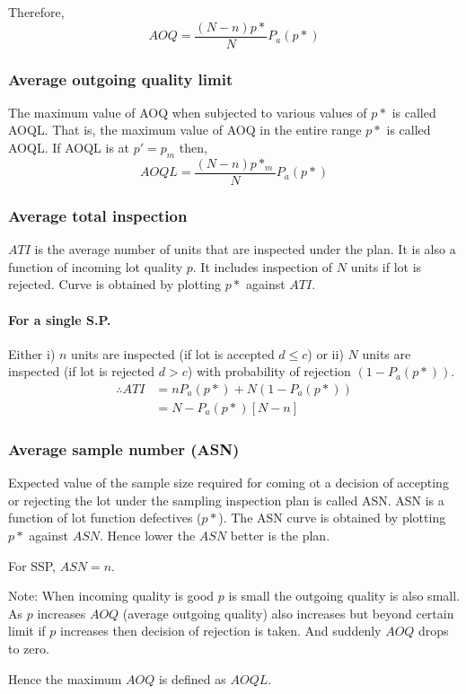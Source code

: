 \documentclass[oneside,11pt,pdftex]{book}%
\numberwithin{equation}{section}
\numberwithin{section}{chapter}
\numberwithin{equation}{chapter}
\begin{document}
Therefore,\[ AOQ=\frac{(N-n)p*}{N}P_a(p*) \]

\subsubsection{Average outgoing quality limit}
The maximum value of AOQ when subjected to various values of $ p* $ is called AOQL. That is, the maximum value of AOQ in the entire range $ p* $ is called AOQL. If AOQL is at $ p'=p_m $ then,
\[ AOQL=\frac{(N-n)p*_m}{N}P_a(p*) \]

\subsubsection{Average total inspection}
$ ATI $ is the average number of units that are inspected under the plan. It is also a function of incoming lot quality $ p $. It includes inspection of $ N $ units if lot is rejected. Curve is obtained by plotting $ p* $ against $ ATI $.

\paragraph{For a single S.P.}
Either i) $ n $ units are inspected (if lot is accepted $ d \leq c $) or ii) $ N $  units are inspected (if lot is rejected $ d>c $) with probability of rejection $ (1-P_a(p*)) $.
\begin{align*}
	\therefore ATI&= nP_a(p*)+N(1-P_a(p*))\\
	&= N-P_a(p*)[N-n]
\end{align*}

\subsubsection{Average sample number (ASN)}
Expected value of the sample size required for coming ot a decision of accepting or rejecting the lot under the sampling inspection plan is called ASN. ASN is a function of lot function defectives ($ p* $). The ASN curve is obtained by plotting $ p* $ against $ ASN $. Hence lower the $ ASN $ better is the plan.

For SSP, $ ASN=n $.

Note: When incoming quality is good $ p $ is small the outgoing quality is also small. As $ p $ increases $ AOQ $ (average outgoing quality) also increases but beyond certain limit if $ p $ increases then decision of rejection is taken. And suddenly $ AOQ $ drops to zero.

Hence the maximum $ AOQ $ is defined as $ AOQL $.
\end{document}
